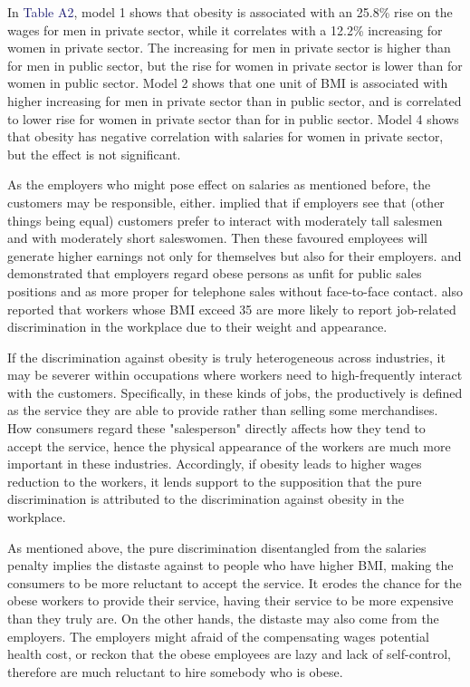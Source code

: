 \documentclass{article}
\begin{document}
In \textcolor{MidnightBlue}{Table A2}, model 1 shows that obesity is associated with an 25.8\% rise on the wages for men in private sector, while it correlates with a 12.2\% increasing for women in private sector. The increasing for men in private sector is higher than for men in public sector, but the rise for women in private sector is lower than for women in public sector. Model 2 shows that one unit of BMI is associated with higher increasing for men in private sector than in public sector, and is correlated to lower rise for women in private sector than for in public sector. Model 4 shows that obesity has negative correlation with salaries for women in private sector, but the effect is not significant.
\par
\setlength{\parindent}{2em}
As the employers who might pose effect on salaries as mentioned before, the customers may be responsible, either. \citet{hubler2009nonlinear} implied that if employers see that (other things being equal) customers prefer to interact with moderately tall salesmen and with moderately short saleswomen. Then these favoured employees will generate higher earnings not only for themselves but also for their employers.\citet{everett1990let} and \citet{puhl2001bias}demonstrated that employers regard obese persons as unfit for public sales positions and as more proper for telephone sales without face-to-face contact. \citet{carr2005obesity} also reported that workers whose BMI exceed 35 are more likely to report job-related discrimination in the workplace due to their weight and appearance.
\par
\setlength{\parindent}{2em}
If the discrimination against obesity is truly heterogeneous across industries, it may be severer within occupations where workers need to high-frequently interact with the customers. Specifically, in these kinds of jobs, the productively is defined as the service they are able to provide rather than selling some merchandises. How consumers regard these "salesperson" directly affects how they tend to accept the service, hence the physical appearance of the workers are much more important in these industries. Accordingly, if obesity leads to higher wages reduction to the workers, it lends support to the supposition that the pure discrimination is attributed to the discrimination against obesity in the workplace.
\par
\setlength{\parindent}{2em}
As mentioned above, the pure discrimination disentangled from the salaries penalty implies the distaste against to people who have higher BMI, making the consumers to be more reluctant to accept the service. It erodes the chance for the obese workers to provide their service, having their service to be more expensive than they truly are. On the other hands, the distaste may also come from the employers. The employers might afraid of the compensating wages potential health cost, or reckon that the obese employees are lazy and lack of self-control, therefore are much reluctant to hire somebody who is obese.
\end{document}
